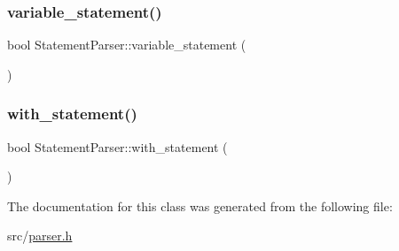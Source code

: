 \mbox{\label{class_statement_parser_a9f5cc7bedf5e4ed50f38808621020106}} 
\subsubsection{\texorpdfstring{variable\+\_\+statement()}{variable\_statement()}}
{\footnotesize\ttfamily bool Statement\+Parser\+::variable\+\_\+statement (\begin{DoxyParamCaption}{ }\end{DoxyParamCaption})\hspace{0.3cm}{\ttfamily [inline]}}

\mbox{\label{class_statement_parser_aeff39f49a917ae145c007a7864997938}} 
\subsubsection{\texorpdfstring{with\+\_\+statement()}{with\_statement()}}
{\footnotesize\ttfamily bool Statement\+Parser\+::with\+\_\+statement (\begin{DoxyParamCaption}{ }\end{DoxyParamCaption})\hspace{0.3cm}{\ttfamily [inline]}}



The documentation for this class was generated from the following file\+:\begin{DoxyCompactItemize}
\item 
src/\hyperlink{parser_8h}{parser.\+h}\end{DoxyCompactItemize}
